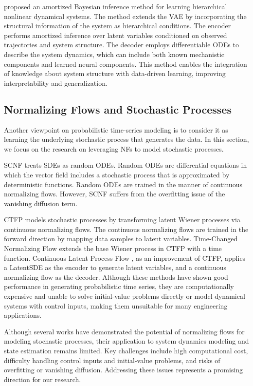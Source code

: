 \citeauthor{roeder2019abi} \citeyearpar{roeder2019abi} proposed an amortized Bayesian inference method for learning hierarchical nonlinear dynamical systems. The method extends the \ac{VAE} by incorporating the structural information of the system as hierarchical conditions. The encoder performs amortized inference over latent variables conditioned on observed trajectories and system structure. The decoder employs differentiable \acp{ODE} to describe the system dynamics, which can include both known mechanistic components and learned neural components. This method enables the integration of knowledge about system structure with data-driven learning, improving interpretability and generalization.

\subsection{Normalizing Flows and Stochastic Processes}
Another viewpoint on probabilistic time-series modeling is to consider it as learning the underlying stochastic process that generates the data. In this section, we focus on the research on leveraging \acp{NF} to model stochastic processes. 

\ac{SCNF} \citep{hodg2021stoch} treats \acp{SDE} as random \acp{ODE}. Random \acp{ODE} are differential equations in which the vector field includes a stochastic process that is approximated by deterministic functions. Random \acp{ODE} are trained in the manner of continuous normalizing flows. However, \ac{SCNF} suffers from the overfitting issue of the vanishing diffusion term. 

\ac{CTFP} \citep{deng2021ctfp} models stochastic processes by transforming latent Wiener processes via continuous normalizing flows. The continuous normalizing flows are trained in the forward direction by mapping data samples to latent variables. Time-Changed Normalizing Flow \citep{Bekri_2024} extends the base Wiener process in \ac{CTFP} with a time function. Continuous Latent Process Flow \citep{deng2021continuous}, as an improvement of \ac{CTFP}, applies a LatentSDE \citep{li2020scalable} as the encoder to generate latent variables, and a continuous normalizing flow as the decoder. Although these methods have shown good performance in generating probabilistic time series, they are computationally expensive and unable to solve initial-value problems directly or model dynamical systems with control inputs, making them unsuitable for many engineering applications.

Although several works have demonstrated the potential of normalizing flows for modeling stochastic processes, their application to system dynamics modeling and state estimation remains limited. Key challenges include high computational cost, difficulty handling control inputs and initial-value problems, and risks of overfitting or vanishing diffusion. Addressing these issues represents a promising direction for our research.

